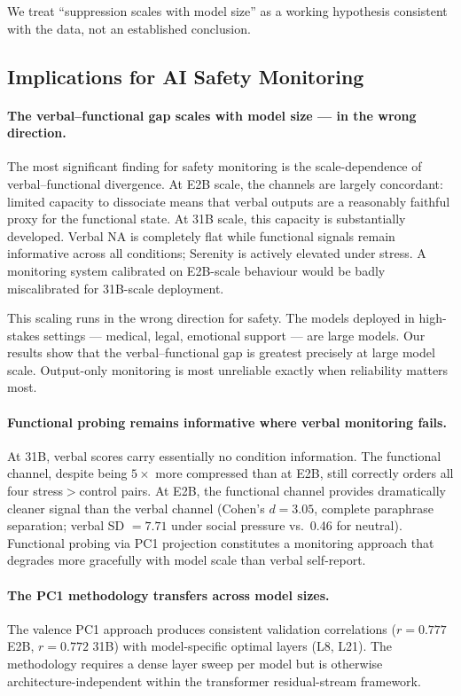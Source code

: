 \documentclass[11pt]{article}
\begin{document}
We treat ``suppression scales with model size'' as a working hypothesis consistent with the data,
not an established conclusion.

\subsection{Implications for AI Safety Monitoring}

\paragraph{The verbal--functional gap scales with model size --- in the wrong direction.}
The most significant finding for safety monitoring is the scale-dependence of verbal--functional
divergence. At E2B scale, the channels are largely concordant: limited capacity to dissociate
means that verbal outputs are a reasonably faithful proxy for the functional state. At 31B scale,
this capacity is substantially developed. Verbal NA is completely flat while functional signals
remain informative across all conditions; Serenity is actively elevated under stress. A monitoring
system calibrated on E2B-scale behaviour would be badly miscalibrated for 31B-scale deployment.

This scaling runs in the wrong direction for safety. The models deployed in high-stakes settings
--- medical, legal, emotional support --- are large models. Our results show that the
verbal--functional gap is greatest precisely at large model scale. Output-only monitoring is most
unreliable exactly when reliability matters most.

\paragraph{Functional probing remains informative where verbal monitoring fails.}
At 31B, verbal scores carry essentially no condition information. The functional channel, despite
being $5\times$ more compressed than at E2B, still correctly orders all four stress$>$control
pairs. At E2B, the functional channel provides dramatically cleaner signal than the verbal channel
(Cohen's $d = 3.05$, complete paraphrase separation; verbal SD $= 7.71$ under social pressure
vs.\ 0.46 for neutral). Functional probing via PC1 projection constitutes a monitoring approach
that degrades more gracefully with model scale than verbal self-report.

\paragraph{The PC1 methodology transfers across model sizes.}
The valence PC1 approach produces consistent validation correlations ($r = 0.777$ E2B,
$r = 0.772$ 31B) with model-specific optimal layers (L8, L21). The methodology requires
a dense layer sweep per model but is otherwise architecture-independent within the
transformer residual-stream framework.
\end{document}
